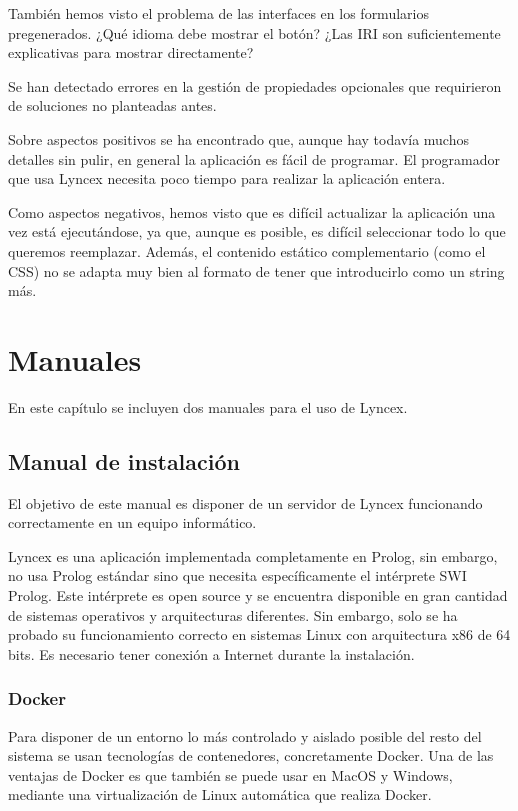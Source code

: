 \documentclass[openright,twoside,12pt]{book}
\begin{document}
También hemos visto el problema de las interfaces en los formularios pregenerados. ¿Qué idioma debe mostrar el botón? ¿Las IRI son suficientemente explicativas para mostrar directamente?

Se han detectado errores en la gestión de propiedades opcionales que requirieron de soluciones no planteadas antes.

Sobre aspectos positivos se ha encontrado que, aunque hay todavía muchos detalles sin pulir, en general la aplicación es fácil de programar. El programador que usa Lyncex necesita poco tiempo para realizar la aplicación entera. 

Como aspectos negativos, hemos visto que es difícil actualizar la aplicación una vez está ejecutándose, ya que, aunque es posible, es difícil seleccionar todo lo que queremos reemplazar. Además, el contenido estático complementario (como el CSS) no se adapta muy bien al formato de tener que introducirlo como un string más.

\chapter{Manuales}

En este capítulo se incluyen dos manuales para el uso de Lyncex.

\section{Manual de instalación}

El objetivo de este manual es disponer de un servidor de Lyncex funcionando correctamente en un equipo informático.

Lyncex es una aplicación implementada completamente en Prolog, sin embargo, no usa Prolog estándar sino que necesita específicamente el intérprete SWI Prolog. Este intérprete es open source y se encuentra disponible en gran cantidad de sistemas operativos y arquitecturas diferentes. Sin embargo, solo se ha probado su funcionamiento correcto en sistemas Linux con arquitectura x86 de 64 bits. Es necesario tener conexión a Internet durante la instalación.

\subsection{Docker}

Para disponer de un entorno lo más controlado y aislado posible del resto del sistema se usan tecnologías de contenedores, concretamente Docker. Una de las ventajas de Docker es que también se puede usar en MacOS y Windows, mediante una virtualización de Linux automática que realiza Docker.
\end{document}
